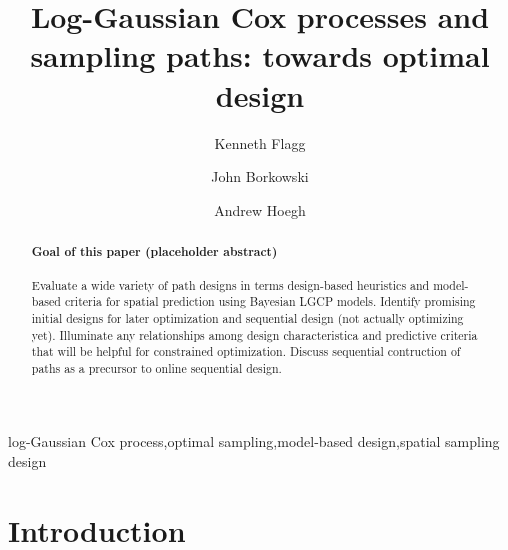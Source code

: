 \documentclass[review]{elsarticle}
\begin{document}
\begin{frontmatter}

\title{Log-Gaussian Cox processes and sampling paths: towards optimal design}

\author[msuaddr]{Kenneth Flagg}

\author[msuaddr]{John Borkowski}
\author[msuaddr]{Andrew Hoegh}

\address[msuaddr]{Department of Mathematical Sciences, Montana State University, Bozeman, MT 59717}

\begin{abstract}

\paragraph{Goal of this paper (placeholder abstract)} Evaluate a wide variety
of path designs in terms design-based heuristics and model-based criteria for
spatial prediction using Bayesian LGCP models. Identify promising initial
designs for later optimization and sequential design (not actually optimizing
yet). Illuminate any relationships among design characteristica and
predictive criteria that will be helpful for constrained optimization. Discuss
sequential contruction of paths as a precursor to online sequential design.

\end{abstract}

\begin{keyword}
log-Gaussian Cox process\sep optimal sampling\sep model-based design\sep spatial sampling design
\end{keyword}

\end{frontmatter}

\linenumbers



\section{Introduction}
\end{document}
